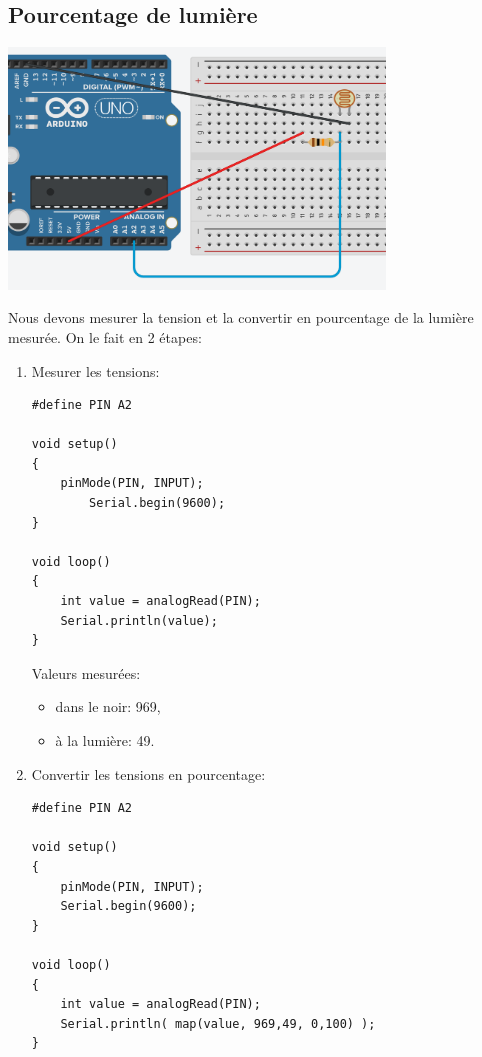 \documentclass[a4paper]{article}
\begin{document}
\subsection{Pourcentage de lumière}





\begin{center}
    \includegraphics[width=0.75\textwidth]{images/pourcentage-lumiere-1.PNG}
\end{center}





Nous devons mesurer la tension et la convertir en pourcentage de la lumière mesurée. On le fait en 2 étapes:
\begin{enumerate}

\item Mesurer les tensions:
\begin{lstlisting}[frame=single]
#define PIN A2

void setup()
{
    pinMode(PIN, INPUT);
        Serial.begin(9600);
}

void loop()
{
    int value = analogRead(PIN);
    Serial.println(value);
}
\end{lstlisting}
Valeurs mesurées:
\begin{itemize}
    \item dans le noir: 969,
    \item à la lumière: 49.
\end{itemize}

\item Convertir les tensions en pourcentage:
\begin{lstlisting}[frame=single]
#define PIN A2

void setup()
{
    pinMode(PIN, INPUT);
    Serial.begin(9600);
}

void loop()
{
    int value = analogRead(PIN);
    Serial.println( map(value, 969,49, 0,100) );
}
\end{lstlisting}

\end{enumerate}
\end{document}
